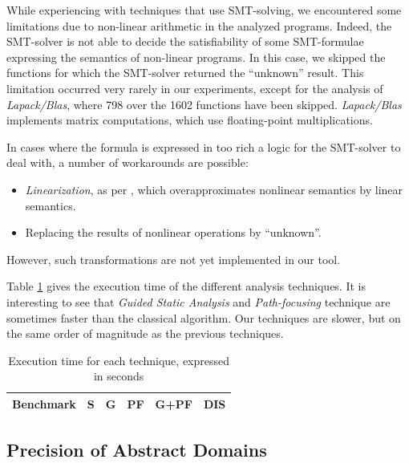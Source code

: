 \documentclass[preprint]{sigplanconf}
\begin{document}
While experiencing with techniques that use SMT-solving, we encountered some
limitations due to non-linear arithmetic in the analyzed programs. Indeed, 
the SMT-solver is not able to decide the satisfiability of some SMT-formulae
expressing the semantics of non-linear programs. 
In this case, we skipped the functions for which the SMT-solver returned the
``unknown'' result.
This limitation occurred very rarely in our experiments, except for the analysis
of \emph{Lapack/Blas}, where 798 over the 1602 functions have been skipped.
\emph{Lapack/Blas} implements matrix computations, which use floating-point multiplications.

In cases where the formula is expressed in too rich a logic for the SMT-solver to deal with, a number of workarounds are possible:
\begin{itemize}[itemsep=-\parsep,topsep=0pt,partopsep=0pt]
\item \emph{Linearization}, as per \citet{DBLP:conf/vmcai/Mine06}, which overapproximates nonlinear semantics by linear semantics.
\item Replacing the results of nonlinear operations by ``unknown''.
\end{itemize}
However, such transformations are not yet implemented in our tool.

Table \ref{tab:time} gives the execution time of the different analysis
techniques. It is interesting to see that \emph{Guided Static Analysis} and
\emph{Path-focusing} technique are sometimes faster than the classical
algorithm. Our techniques are slower, but on the same order of magnitude as
the previous techniques.

\begin{table}[!h]
	\centering
\begin{tabular}{|l|r|r|r|r|r|} \hline
	Benchmark & \textbf{S} & \textbf{G} & \textbf{PF} & \textbf{G+PF} &
	\textbf{DIS} \\ \hline
	 \hline
\end{tabular}
\caption{Execution time for each technique, expressed in seconds}
\label{tab:time}
\end{table}


\subsection{Precision of Abstract Domains}
\end{document}
